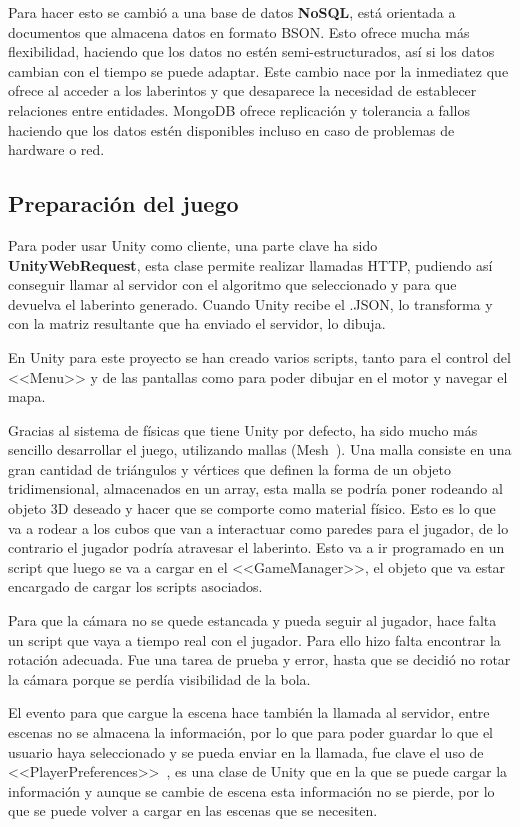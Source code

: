 Para hacer esto se cambió a una base de datos \textbf{NoSQL}, está orientada a documentos que almacena datos en formato BSON. Esto ofrece mucha más flexibilidad, haciendo que los datos no estén semi-estructurados, así si los datos cambian con el tiempo se puede adaptar. Este cambio nace por la inmediatez que ofrece al acceder a los laberintos y que desaparece la necesidad de establecer relaciones entre entidades. MongoDB ofrece replicación y tolerancia a fallos haciendo que los datos estén disponibles incluso en caso de problemas de hardware o red.


\subsection{Preparación del juego}
Para poder usar Unity como cliente, una parte clave ha sido \textbf{UnityWebRequest}, esta clase permite realizar llamadas HTTP, pudiendo así conseguir llamar al servidor con el algoritmo que seleccionado y para que devuelva el laberinto generado. 
Cuando Unity recibe el .JSON, lo transforma y con la matriz resultante que ha enviado el servidor, lo dibuja.

En Unity para este proyecto se han creado varios scripts, tanto para el control del <<Menu>> y de las pantallas como para poder dibujar en el motor y navegar el mapa. 

Gracias al sistema de físicas que tiene Unity por defecto, ha sido mucho más sencillo desarrollar el juego, utilizando mallas (Mesh~\cite{unitymesh}). Una malla consiste en una gran cantidad de triángulos y vértices que definen la forma de un objeto tridimensional, almacenados en un array, esta malla se podría poner rodeando al objeto 3D deseado y hacer que se comporte como material físico. Esto es lo que va a rodear a los cubos que van a interactuar como paredes para el jugador, de lo contrario el jugador podría atravesar el laberinto. Esto va a ir programado en un script que luego se va a cargar en el <<GameManager>>, el objeto que va estar encargado de cargar los scripts asociados.

Para que la cámara no se quede estancada y pueda seguir al jugador, hace falta un script que vaya a tiempo real con el jugador. Para ello hizo falta encontrar la rotación adecuada. Fue una tarea de prueba y error, hasta que se decidió no rotar la cámara porque se perdía visibilidad de la bola.

El evento para que cargue la escena hace también la llamada al servidor, entre escenas no se almacena la información, por lo que para poder guardar lo que el usuario haya seleccionado y se pueda enviar en la llamada, fue clave el uso de <<PlayerPreferences>>~\cite{unityplayerprefs}, es una clase de Unity que en la que se puede cargar la información y aunque se cambie de escena esta información no se pierde, por lo que se puede volver a cargar en las escenas que se necesiten.

